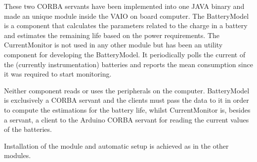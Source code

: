 These two CORBA servants have been implemented into one JAVA binary and made an
unique module inside the VAIO on board computer. The BatteryModel is a component
that calculates the parameters related to the charge in a battery and estimates
the remaining life based on the power requirements. The CurrentMonitor is not
used in any other module but has been an utility component for developing the
BatteryModel. It periodically polls the current of the (currently
instrumentation) batteries and reports the mean consumption since it was
required to start monitoring.

Neither component reads or uses the peripherals on the computer. BatteryModel is
exclusively a CORBA servant and the clients must pass the data to it in order to
compute the estimations for the battery life, whilst CurrentMonitor is, besides
a servant, a client to the Arduino CORBA servant for reading the current values
of the batteries.

Installation of the module and automatic setup is achieved as in the other
modules.





